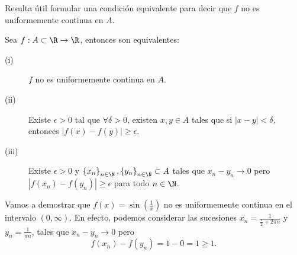 Resulta útil formular una condición equivalente para decir que $\displaystyle f $ no es uniformemente continua en $\displaystyle A $.
\begin{fprop}
\normalfont Sea $\displaystyle f : A \subset \R \to \R $, entonces son equivalentes:
\begin{description}
\item[(i)] $\displaystyle f $ no es uniformemente continua en $\displaystyle A $.
\item[(ii)] Existe $\displaystyle \epsilon > 0 $ tal que $\displaystyle \forall \delta > 0 $, existen $\displaystyle x,y \in A $ tales que si $\displaystyle \left|x-y\right| < \delta  $, entonces $\displaystyle \left|f\left(x\right)-f\left(y\right)\right| \geq \epsilon  $.
\item[(iii)] Existe $\displaystyle \epsilon > 0 $ y $\displaystyle \left\{ x_{n}\right\} _{n\in\N}, \left\{ y_{n}\right\} _{n\in\N}\subset A $ tales que $\displaystyle x_{n}-y_{n} \to 0 $ pero $\displaystyle \left|f\left(x_{n}\right)-f\left(y_{n}\right)\right| \geq \epsilon  $ para todo $\displaystyle n \in \N $.
\end{description}
\end{fprop}
\begin{eg}
\normalfont Vamos a demostrar que $\displaystyle f\left(x\right) = \sin\left(\frac{1}{x}\right) $ no es uniformemente continua en el intervalo $\displaystyle \left(0, \infty\right) $. En efecto, podemos considerar las sucesiones $\displaystyle x_{n} = \frac{1}{\frac{\pi }{2} + 2\pi n} $ y $\displaystyle y_{n} = \frac{1}{\pi n} $, tales que $\displaystyle x_{n}-y_{n} \to 0 $ pero 
\[ f\left(x_{n}\right)-f\left(y_{n}\right) = 1 - 0=1 \geq 1 .\]
\end{eg}

